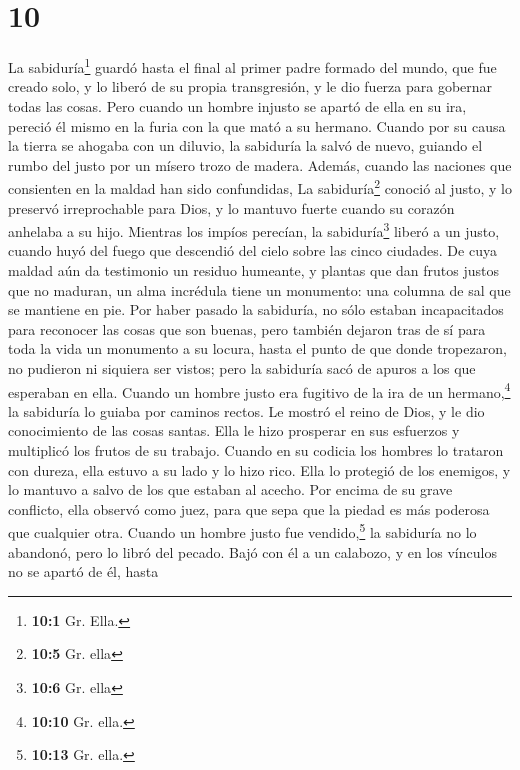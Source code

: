 \hypertarget{section-9}{%
\section{10}\label{section-9}}

 La sabiduría\footnote{\textbf{10:1} Gr. Ella.} guardó
hasta el final al primer padre formado del mundo, que fue creado solo, y
lo liberó de su propia transgresión,  y le dio fuerza para
gobernar todas las cosas.  Pero cuando un hombre injusto
se apartó de ella en su ira, pereció él mismo en la furia con la que
mató a su hermano.  Cuando por su causa la tierra se
ahogaba con un diluvio, la sabiduría la salvó de nuevo, guiando el rumbo
del justo por un mísero trozo de madera.  Además, cuando
las naciones que consienten en la maldad han sido confundidas, La
sabiduría\footnote{\textbf{10:5} Gr. ella} conoció al justo, y lo
preservó irreprochable para Dios, y lo mantuvo fuerte cuando su corazón
anhelaba a su hijo.  Mientras los impíos perecían, la
sabiduría\footnote{\textbf{10:6} Gr. ella} liberó a un justo, cuando
huyó del fuego que descendió del cielo sobre las cinco ciudades.
 De cuya maldad aún da testimonio un residuo humeante, y
plantas que dan frutos justos que no maduran, un alma incrédula tiene un
monumento: una columna de sal que se mantiene en pie.  Por
haber pasado la sabiduría, no sólo estaban incapacitados para reconocer
las cosas que son buenas, pero también dejaron tras de sí para toda la
vida un monumento a su locura, hasta el punto de que donde tropezaron,
no pudieron ni siquiera ser vistos;  pero la sabiduría
sacó de apuros a los que esperaban en ella.  Cuando un
hombre justo era fugitivo de la ira de un hermano,\footnote{\textbf{10:10}
  Gr. ella.} la sabiduría lo guiaba por caminos rectos. Le mostró el
reino de Dios, y le dio conocimiento de las cosas santas. Ella le hizo
prosperar en sus esfuerzos y multiplicó los frutos de su trabajo.
 Cuando en su codicia los hombres lo trataron con dureza,
ella estuvo a su lado y lo hizo rico.  Ella lo protegió
de los enemigos, y lo mantuvo a salvo de los que estaban al acecho. Por
encima de su grave conflicto, ella observó como juez, para que sepa que
la piedad es más poderosa que cualquier otra.  Cuando un
hombre justo fue vendido,\footnote{\textbf{10:13} Gr. ella.} la
sabiduría no lo abandonó, pero lo libró del pecado. Bajó con él a un
calabozo,  y en los vínculos no se apartó de él, hasta
